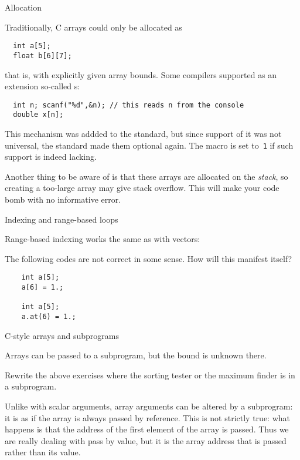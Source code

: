  {Allocation}

Traditionally, C arrays could only be allocated as
\begin{lstlisting}
  int a[5];
  float b[6][7];
\end{lstlisting}
that is, with explicitly given array bounds.
Some compilers supported as an extension
so-called s:
\begin{lstlisting}
  int n; scanf("%d",&n); // this reads n from the console
  double x[n];
\end{lstlisting}
This mechanism was addded to the  standard,
but since support of it was not universal,
the  standard made them optional again.
The macro  is set to~\lstinline{1}
if such support is indeed lacking.

Another thing to be aware of is that these arrays
are allocated on the \emph{stack},
so creating a too-large array may give stack overflow.
This will make your code bomb with no informative error.

 {Indexing and range-based loops}

Range-based indexing works the same as with vectors:
%

\begin{review}
  The following codes are not correct in some sense. How will this manifest itself?
  \begin{lstlisting}
    int a[5];
    a[6] = 1.;

    int a[5];
    a.at(6) = 1.;
  \end{lstlisting}
\end{review}

 {C-style arrays and subprograms}

Arrays can be passed to a subprogram, but the bound is unknown there.
%
%
\begin{exercise}
  Rewrite the above exercises where the sorting tester or the maximum
  finder is in a subprogram.
\end{exercise}

Unlike with scalar arguments, array arguments can be altered by a
subprogram: it is as if the array is always passed by reference. This is
not strictly true: what happens is that the address of the first
element of the array is passed. Thus we are really dealing with pass
by value, but it is the array address that is passed rather than its value.

